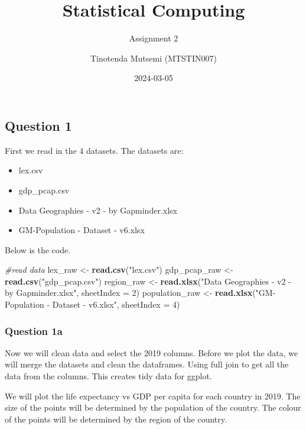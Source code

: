\documentclass[
]{article}
\title{Statistical Computing}
\subtitle{Assignment 2}
\author{Tinotenda Mutsemi (MTSTIN007)}
\date{2024-03-05}
\newenvironment{Shaded}{\begin{snugshade}}{\end{snugshade}}
\newcommand{\AttributeTok}[1]{\textcolor[rgb]{0.13,0.29,0.53}{#1}}
\newcommand{\CommentTok}[1]{\textcolor[rgb]{0.56,0.35,0.01}{\textit{#1}}}
\newcommand{\DecValTok}[1]{\textcolor[rgb]{0.00,0.00,0.81}{#1}}
\newcommand{\FunctionTok}[1]{\textcolor[rgb]{0.13,0.29,0.53}{\textbf{#1}}}
\newcommand{\NormalTok}[1]{#1}
\newcommand{\OtherTok}[1]{\textcolor[rgb]{0.56,0.35,0.01}{#1}}
\newcommand{\StringTok}[1]{\textcolor[rgb]{0.31,0.60,0.02}{#1}}
\begin{document}
\maketitle

\hypertarget{question-1}{%
\subsection{Question 1}\label{question-1}}

First we read in the 4 datasets. The datasets are:

\begin{itemize}
\item
  lex.csv
\item
  gdp\_pcap.csv
\item
  Data Geographies - v2 - by Gapminder.xlsx
\item
  GM-Population - Dataset - v6.xlsx
\end{itemize}

Below is the code.

\begin{Shaded}
\begin{Highlighting}[]
\CommentTok{\#read data}
\NormalTok{lex\_raw }\OtherTok{\textless{}{-}} \FunctionTok{read.csv}\NormalTok{(}\StringTok{"lex.csv"}\NormalTok{)}
\NormalTok{gdp\_pcap\_raw }\OtherTok{\textless{}{-}} \FunctionTok{read.csv}\NormalTok{(}\StringTok{"gdp\_pcap.csv"}\NormalTok{)}
\NormalTok{region\_raw }\OtherTok{\textless{}{-}} \FunctionTok{read.xlsx}\NormalTok{(}\StringTok{"Data Geographies {-} v2 {-} by Gapminder.xlsx"}\NormalTok{, }\AttributeTok{sheetIndex =} \DecValTok{2}\NormalTok{)}
\NormalTok{population\_raw }\OtherTok{\textless{}{-}} \FunctionTok{read.xlsx}\NormalTok{(}\StringTok{"GM{-}Population {-} Dataset {-} v6.xlsx"}\NormalTok{, }\AttributeTok{sheetIndex =} \DecValTok{4}\NormalTok{)}
\end{Highlighting}
\end{Shaded}

\hypertarget{question-1a}{%
\subsubsection{Question 1a}\label{question-1a}}

Now we will clean data and select the 2019 columns. Before we plot the
data, we will merge the datasets and clean the dataframes. Using full
join to get all the data from the columns. This creates tidy data for
ggplot.

We will plot the life expectancy vs GDP per capita for each country in
2019. The size of the points will be determined by the population of the
country. The colour of the points will be determined by the region of
the country.
\end{document}
